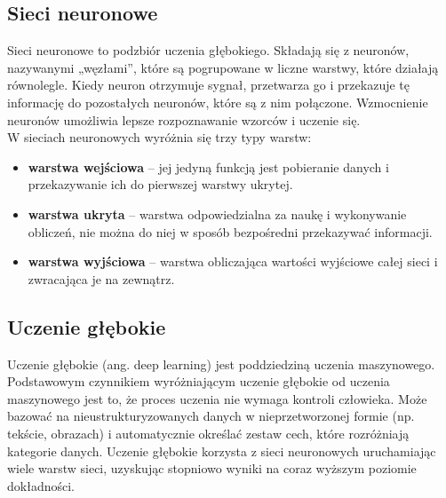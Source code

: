 \documentclass{article}
\begin{document}
\subsection{Sieci neuronowe}
Sieci neuronowe to podzbiór uczenia głębokiego. Składają się z neuronów, nazywanymi „węzłami”, które są pogrupowane w liczne warstwy, które działają równolegle. Kiedy neuron otrzymuje sygnał, przetwarza go i przekazuje tę informację do pozostałych neuronów, które są z nim połączone. Wzmocnienie neuronów umożliwia lepsze rozpoznawanie wzorców i uczenie się.
\break \\
W sieciach neuronowych wyróżnia się trzy typy warstw:
\begin{itemize}
  \item \textbf{warstwa wejściowa} – jej jedyną funkcją jest pobieranie danych i przekazywanie ich do pierwszej warstwy ukrytej.
  \item \textbf{warstwa ukryta} – warstwa odpowiedzialna za naukę i wykonywanie obliczeń, nie można do niej w sposób bezpośredni przekazywać informacji.
  \item \textbf{warstwa wyjściowa} – warstwa obliczająca wartości wyjściowe całej sieci i zwracająca je na zewnątrz.
\end{itemize}
\subsection{Uczenie głębokie}
Uczenie głębokie (ang. deep learning) jest poddziedziną uczenia maszynowego.
Podstawowym czynnikiem wyróżniającym uczenie głębokie od uczenia maszynowego jest to, że proces uczenia nie wymaga kontroli człowieka.
Może bazować na nieustrukturyzowanych danych w nieprzetworzonej formie (np. tekście, obrazach) i automatycznie określać zestaw cech, które rozróżniają kategorie danych.
Uczenie głębokie korzysta z sieci neuronowych uruchamiając wiele warstw sieci, uzyskując stopniowo wyniki na coraz wyższym poziomie dokładności.
\end{document}
